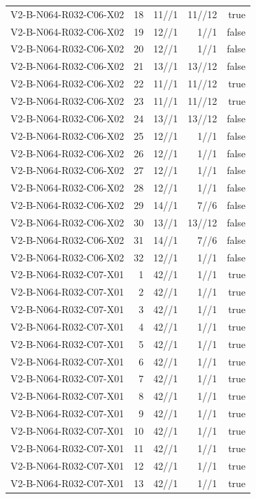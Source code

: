 {\begin{longtable}{lrrrr}
V2-B-N064-R032-C06-X02 & 18 & 11//1 & 11//12 & true \\
V2-B-N064-R032-C06-X02 & 19 & 12//1 & 1//1 & false \\
V2-B-N064-R032-C06-X02 & 20 & 12//1 & 1//1 & false \\
V2-B-N064-R032-C06-X02 & 21 & 13//1 & 13//12 & false \\
V2-B-N064-R032-C06-X02 & 22 & 11//1 & 11//12 & true \\
V2-B-N064-R032-C06-X02 & 23 & 11//1 & 11//12 & true \\
V2-B-N064-R032-C06-X02 & 24 & 13//1 & 13//12 & false \\
V2-B-N064-R032-C06-X02 & 25 & 12//1 & 1//1 & false \\
V2-B-N064-R032-C06-X02 & 26 & 12//1 & 1//1 & false \\
V2-B-N064-R032-C06-X02 & 27 & 12//1 & 1//1 & false \\
V2-B-N064-R032-C06-X02 & 28 & 12//1 & 1//1 & false \\
V2-B-N064-R032-C06-X02 & 29 & 14//1 & 7//6 & false \\
V2-B-N064-R032-C06-X02 & 30 & 13//1 & 13//12 & false \\
V2-B-N064-R032-C06-X02 & 31 & 14//1 & 7//6 & false \\
V2-B-N064-R032-C06-X02 & 32 & 12//1 & 1//1 & false \\
V2-B-N064-R032-C07-X01 & 1 & 42//1 & 1//1 & true \\
V2-B-N064-R032-C07-X01 & 2 & 42//1 & 1//1 & true \\
V2-B-N064-R032-C07-X01 & 3 & 42//1 & 1//1 & true \\
V2-B-N064-R032-C07-X01 & 4 & 42//1 & 1//1 & true \\
V2-B-N064-R032-C07-X01 & 5 & 42//1 & 1//1 & true \\
V2-B-N064-R032-C07-X01 & 6 & 42//1 & 1//1 & true \\
V2-B-N064-R032-C07-X01 & 7 & 42//1 & 1//1 & true \\
V2-B-N064-R032-C07-X01 & 8 & 42//1 & 1//1 & true \\
V2-B-N064-R032-C07-X01 & 9 & 42//1 & 1//1 & true \\
V2-B-N064-R032-C07-X01 & 10 & 42//1 & 1//1 & true \\
V2-B-N064-R032-C07-X01 & 11 & 42//1 & 1//1 & true \\
V2-B-N064-R032-C07-X01 & 12 & 42//1 & 1//1 & true \\
V2-B-N064-R032-C07-X01 & 13 & 42//1 & 1//1 & true \\

\end{longtable}}
